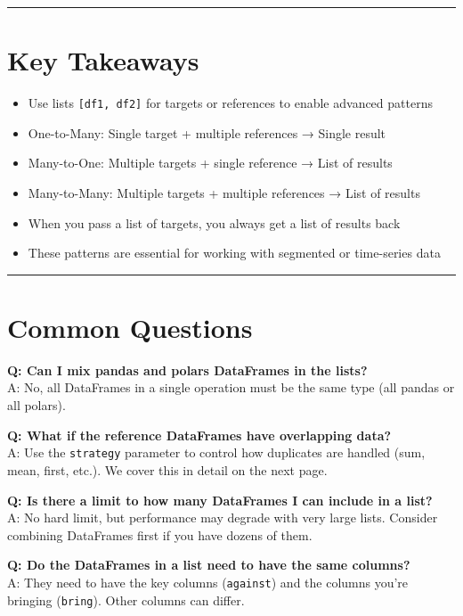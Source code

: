 \documentclass[
  letterpaper,
]{scrbook}
\providecommand{\tightlist}{%
  \setlength{\itemsep}{0pt}\setlength{\parskip}{0pt}}
\begin{document}
\begin{center}\rule{0.5\linewidth}{0.5pt}\end{center}

\section{Key Takeaways}\label{key-takeaways-2}

\begin{itemize}
\tightlist
\item
  Use lists \texttt{{[}df1,\ df2{]}} for targets or references to enable
  advanced patterns
\item
  One-to-Many: Single target + multiple references → Single result
\item
  Many-to-One: Multiple targets + single reference → List of results
\item
  Many-to-Many: Multiple targets + multiple references → List of results
\item
  When you pass a list of targets, you always get a list of results back
\item
  These patterns are essential for working with segmented or time-series
  data
\end{itemize}

\begin{center}\rule{0.5\linewidth}{0.5pt}\end{center}

\section{Common Questions}\label{common-questions-2}

\textbf{Q: Can I mix pandas and polars DataFrames in the lists?}\\
A: No, all DataFrames in a single operation must be the same type (all
pandas or all polars).

\textbf{Q: What if the reference DataFrames have overlapping data?}\\
A: Use the \texttt{strategy} parameter to control how duplicates are
handled (sum, mean, first, etc.). We cover this in detail on the next
page.

\textbf{Q: Is there a limit to how many DataFrames I can include in a
list?}\\
A: No hard limit, but performance may degrade with very large lists.
Consider combining DataFrames first if you have dozens of them.

\textbf{Q: Do the DataFrames in a list need to have the same columns?}\\
A: They need to have the key columns (\texttt{against}) and the columns
you're bringing (\texttt{bring}). Other columns can differ.
\end{document}

